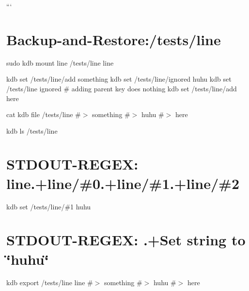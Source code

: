 ``` \hypertarget{autotoc_md374_autotoc_md377}{}\section{Backup-\/and-\/\+Restore\+:/tests/line}\label{autotoc_md374_autotoc_md377}
sudo kdb mount line /tests/line line

kdb set /tests/line/add something kdb set /tests/line/ignored huhu kdb set /tests/line ignored \# adding parent key does nothing kdb set /tests/line/add here

cat {\ttfamily kdb file /tests/line} \#$>$ something \#$>$ huhu \#$>$ here

kdb ls /tests/line \hypertarget{autotoc_md374_autotoc_md378}{}\section{S\+T\+D\+O\+U\+T-\/\+R\+E\+G\+E\+X\+: line.+line/\#0.+line/\#1.+line/\#2}\label{autotoc_md374_autotoc_md378}
kdb set /tests/line/\#1 huhu \hypertarget{autotoc_md374_autotoc_md379}{}\section{S\+T\+D\+O\+U\+T-\/\+R\+E\+G\+E\+X\+: .+\+Set string to \char`\"{}huhu\char`\"{}}\label{autotoc_md374_autotoc_md379}
kdb export /tests/line line \#$>$ something \#$>$ huhu \#$>$ here

